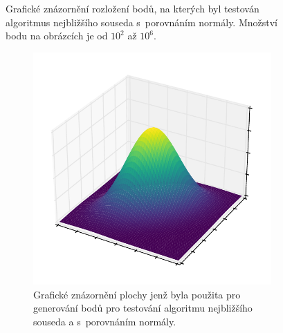 \begin{figure}
    \caption{Grafické znázornění rozložení bodů, na kterých byl testován algoritmus nejbližšího souseda s~porovnáním normály. Množství bodu na obrázcích je od $10^2$ až $10^6$. }
    \label{fig:nn-fig-normal-examples}
\end{figure}

\begin{figure}

\begin{subfigure}[t]{0.5\columnwidth}
\centering
\includegraphics[scale=0.47]{obrazky-figures/knn_norm/points_3d normal_plane_continuouse.pdf}
    \caption{Grafické znázornění plochy jenž byla použita pro generování bodů pro testování algoritmu nejbližšího souseda a s~porovnáním normály. }
        \label{fig:nn-fig-normal-examples-plane}
\end{subfigure}
\hfill
\begin{subfigure}[t]{0.5\columnwidth}
\centering

\end{subfigure}
\end{figure}
